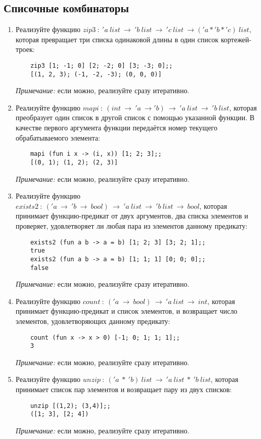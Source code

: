 \documentclass[a4paper,11pt]{article}
\renewcommand{\emph}[1]{\textit{#1}}
\newcommand{\<}{\langle}
\renewcommand{\>}{\rangle}
\begin{document}
\subsection*{Списочные комбинаторы}
\begin{enumerate}
\item Реализуйте функцию 
  $zip3~:~'\!a~list~\rightarrow~'\!b~list~\rightarrow~'\!c~list~\rightarrow
  ('\!a*'\!b*'\!c)~list$,
  которая превращает три списка одинаковой длины в один список кортежей-троек:
  \begin{lstlisting}
    zip3 [1; -1; 0] [2; -2; 0] [3; -3; 0];;
    [(1, 2, 3); (-1, -2, -3); (0, 0, 0)]
  \end{lstlisting}
  \emph{Примечание:} если можно, реализуйте сразу итеративно.

\item Реализуйте функцию $mapi~:~(int~\rightarrow~'\!a~\rightarrow
  '\!b)~\rightarrow~'\!a~list~\rightarrow~'\!b~list$, которая преобразует один
  список в другой список с помощью указанной функции. В качестве первого
  аргумента функции передаётся номер текущего обрабатываемого элемента:
  \begin{lstlisting}
    mapi (fun i x -> (i, x)) [1; 2; 3];;
    [(0, 1); (1, 2); (2, 3)]
  \end{lstlisting}
  \emph{Примечание:} если можно, реализуйте сразу итеративно.

\item Реализуйте функцию
  $exists2~:~('\!a~\rightarrow~'\!b~\rightarrow~bool)~\rightarrow~'\!a~list~
  \rightarrow~'\!b~list~\rightarrow~bool$,
  которая принимает функцию-предикат от двух аргументов, два списка элементов
  и проверяет, удовлетворяет ли любая пара из элементов данному предикату:
  \begin{lstlisting}
    exists2 (fun a b -> a = b) [1; 2; 3] [3; 2; 1];;
    true
    exists2 (fun a b -> a = b) [1; 1; 1] [0; 0; 0];;
    false
  \end{lstlisting}
  \emph{Примечание:} если можно, реализуйте сразу итеративно.

\item Реализуйте функцию $count~:~('\!a~\rightarrow~bool)~
  \rightarrow~'\!a~list~\rightarrow~int$, которая принимает функцию-предикат 
  и список элементов, и возвращает число элементов, удовлетворяющих данному
  предикату:
  \begin{lstlisting}
    count (fun x -> x > 0) [-1; 0; 1; 1; 1];;
    3
  \end{lstlisting}
  \emph{Примечание:} если можно, реализуйте сразу итеративно.

\item Реализуйте функцию $unzip~:~('\!a~*~'\!b)~list~\rightarrow~
  '\!a~list~*~'\!b~list$, которая принимает список пар элементов и возвращает
  пару из двух списков:
  \begin{lstlisting}
    unzip [(1,2); (3,4)];;
    ([1; 3], [2; 4])
  \end{lstlisting}
  \emph{Примечание:} если можно, реализуйте сразу итеративно.
\end{enumerate}
\end{document}
